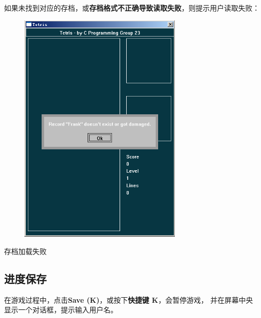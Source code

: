\documentclass{style/ucasproposal}
\begin{document}
如果未找到对应的存档，或\textbf{存档格式不正确导致读取失败}，则提示用户读取失败：
\begin{center}
\begin{figure}[H]
\center
    \includegraphics[width=0.7\textwidth]{./img/manual/11-load-fail.png}
\end{figure}
存档加载失败
\end{center}

\subsection{进度保存}
在游戏过程中，点击\textbf{Save (K)}，或按下\textbf{快捷键 K}，会暂停游戏，
并在屏幕中央显示一个对话框，提示输入用户名。
\end{document}
